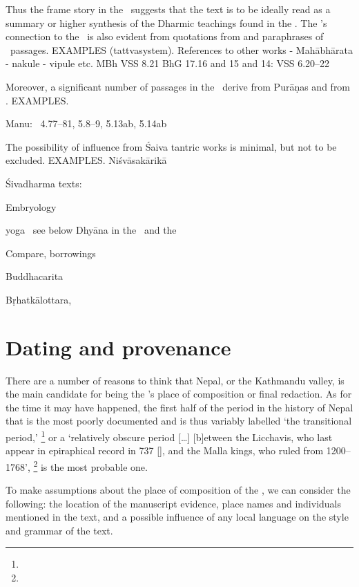 \noindent
Thus the frame story in the \VSS\ suggests
that the text is to be ideally read as a summary 
or higher synthesis of the Dharmic teachings found
in the \MBH. The \VSS's connection to the \MBH\
is also evident from quotations from and paraphrases
of \MBH\ passages. EXAMPLES (tattvasystem).
  References to other works - Mahābhārata - nakule - vipule etc.
MBh VSS 8.21
BhG 17.16 and 15 and 14: VSS 6.20--22
	
Moreover, a significant number of passages in 
the \VSS\ derive from Purāṇas and from \Manu. EXAMPLES.

Manu: \VSS\ 4.77--81, 5.8--9, 5.13ab, 5.14ab

The possibility of influence from Śaiva tantric works is
minimal, but not to be excluded. EXAMPLES.
Niśvāsakārikā



Śivadharma texts:
\label{vss_connection_other_sd_texts}


Embryology

yoga \DharmP\ see below
Dhyāna in the \VSS\ and the \DHARMP
\label{dharmaputrika}

Compare, borrowings

Buddhacarita 

Bṛhatkālottara,








\section{Dating and provenance}
\label{provenance}
There are a number of reasons to think that
Nepal, or the Kathmandu valley, is the main
candidate for being the \VSS's place of composition
or final redaction. As for the time it may have 
happened, the first half of the period in the history of Nepal 
that is the most poorly documented and is thus 
variably labelled `the transitional period,'%
	\footnote{}
or a `relatively obscure period [\dots]
[b]etween the Licchavis, who last appear 
in epiraphical record in 737 [\CE], 
and the Malla kings, who ruled from 1200--1768',%
	\footnote{}
is the most probable one.

To make assumptions about the place of 
composition of the \VSS, we can consider 
the following: the location of the manuscript 
evidence, place names and individuals  
mentioned in the text, and a possible influence
of any local language on the style and grammar
of the text.

